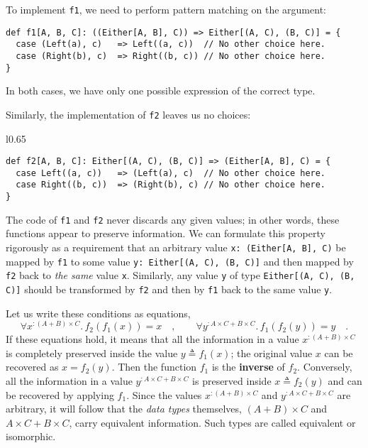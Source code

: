 To implement \lstinline!f1!, we need to perform pattern matching
on the argument:
\begin{lstlisting}
def f1[A, B, C]: ((Either[A, B], C)) => Either[(A, C), (B, C)] = {
  case (Left(a), c)   => Left((a, c))  // No other choice here.
  case (Right(b), c)  => Right((b, c)) // No other choice here.
}
\end{lstlisting}
In both cases, we have only one possible expression of the correct
type.

Similarly, the implementation of \lstinline!f2! leaves us no choices:

\begin{wrapfigure}{l}{0.65\columnwidth}%
\vspace{-0.5\baselineskip}
\begin{lstlisting}
def f2[A, B, C]: Either[(A, C), (B, C)] => (Either[A, B], C) = {
  case Left((a, c))   => (Left(a), c)  // No other choice here.
  case Right((b, c))  => (Right(b), c) // No other choice here.
}
\end{lstlisting}
\vspace{-0.9\baselineskip}
\end{wrapfigure}%

\noindent The code of \lstinline!f1! and \lstinline!f2! never discards
any given values; in other words, these functions appear to preserve
information. We can formulate this property rigorously as a requirement
that an arbitrary value \lstinline!x: (Either[A, B], C)! be mapped
by \lstinline!f1! to some value \lstinline!y: Either[(A, C), (B, C)]!
and then mapped by \lstinline!f2! back to \emph{the same} value \lstinline!x!.
Similarly, any value \lstinline!y! of type \lstinline!Either[(A, C), (B, C)]!
should be transformed by \lstinline!f2! and then by \lstinline!f1!
back to the same value \lstinline!y!.

Let us write these conditions as equations,
\[
\forall x^{:(A+B)\times C}.\,f_{2}(f_{1}(x))=x\quad,\quad\quad\forall y^{:A\times C+B\times C}.\,f_{1}\left(f_{2}(y)\right)=y\quad.
\]
If these equations hold, it means that all the information in a value
$x^{:(A+B)\times C}$ is completely preserved inside the value $y\triangleq f_{1}(x)$;
the original value $x$ can be recovered as $x=f_{2}(y)$. Then the
function $f_{1}$ is the \textbf{inverse}
of $f_{2}$. Conversely, all the information in a value $y^{:A\times C+B\times C}$
is preserved inside $x\triangleq f_{2}(y)$ and can be recovered by
applying $f_{1}$. Since the values $x^{:(A+B)\times C}$ and $y^{:A\times C+B\times C}$
are arbitrary, it will follow that the \emph{data types} themselves,
$\left(A+B\right)\times C$ and $A\times C+B\times C$, carry equivalent
information. Such types are called equivalent
or isomorphic.

